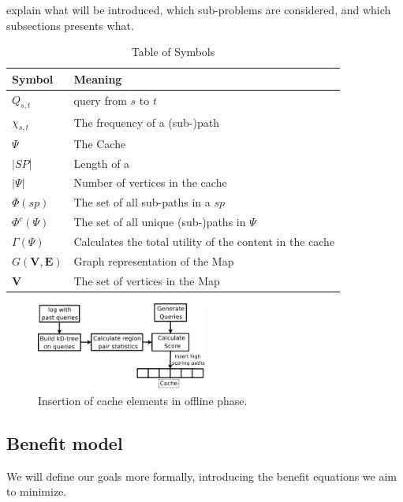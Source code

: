 explain what will be introduced, which sub-problems are considered, and which subsections presents what.


\begin{table}
\begin{tabular*}{\columnwidth}{|l|p{}|}
\hline
\bf Symbol		& \bf Meaning \\\hline
$Q_{s,t}$		& \spath query from $s$ to $t$ \\\hline
$\chi_{s,t}$		& The frequency of a (sub-)path \\\hline
$\Psi$ 			& The Cache \\\hline
$|SP|$			& Length of a \spath \\\hline
$|\Psi|$		& Number of vertices in the cache \\\hline
$\Phi(sp)$		& The set of all sub-paths in a \spath $sp$ \\\hline
$\Phi^c(\Psi)$		& The set of all unique (sub-)paths in $\Psi$ \\\hline
$\Gamma(\Psi)$		& Calculates the total utility of the content in the cache \\\hline 
$G\mathbf{(V,E)}$ 	& Graph representation of the Map \\\hline 
$\mathbf{V}$ 		& The set of vertices in the Map \\\hline 
\end{tabular*}
\caption{Table of Symbols}
\label{tab:symbols}
\end{table}


\begin{figure}[bht]
  \center
        \includegraphics[width=0.5\textwidth]{figures/fillcache}
        \caption{Insertion of cache elements in offline phase.}
  \label{fig:fillcache}
\end{figure}


\subsection{Benefit model}

We will define our goals more formally, introducing the benefit equations we aim to minimize.

